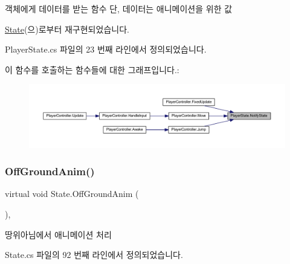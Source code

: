 객체에게 데이터를 받는 함수 단, 데이터는 애니메이션을 위한 값 



\mbox{\hyperlink{class_state_a989a27f9b711812d983344ee381da419}{State}}(으)로부터 재구현되었습니다.



Player\+State.\+cs 파일의 23 번째 라인에서 정의되었습니다.


\begin{DoxyCode}{0}

\end{DoxyCode}
이 함수를 호출하는 함수들에 대한 그래프입니다.\+:
\nopagebreak
\begin{figure}[H]
\begin{center}
\leavevmode
\includegraphics[width=350pt]{d6/d23/class_player_state_a59f3f64c24ba1b6e34e34cb23746ecb0_icgraph}
\end{center}
\end{figure}
\mbox{\label{class_state_a2909a234430fa7752fadf2bb993ab5e2}} 
\subsubsection{\texorpdfstring{OffGroundAnim()}{OffGroundAnim()}}
{\footnotesize\ttfamily virtual void State.\+Off\+Ground\+Anim (\begin{DoxyParamCaption}{ }\end{DoxyParamCaption})\hspace{0.3cm}{\ttfamily [virtual]}, {\ttfamily [inherited]}}



땅위아님에서 애니메이션 처리 



State.\+cs 파일의 92 번째 라인에서 정의되었습니다.


